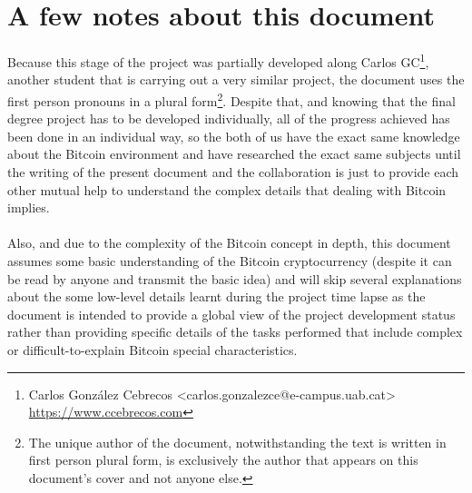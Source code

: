 \documentclass[a4paper,12pt,openany]{report}
\begin{document}
\tableofcontents
\clearpage

\chapter*{A few notes about this document}
Because this stage of the project was partially developed along Carlos GC\footnote{Carlos González Cebrecos <carlos.gonzalezce@e-campus.uab.cat> \url{https://www.ccebrecos.com}}, another student that is carrying out a very similar project, the document uses the first person pronouns in a plural form\footnote{The unique author of the document, notwithstanding the text is written in first person plural form, is exclusively the author that appears on this document's cover and not anyone else.}. Despite that, and knowing that the final degree project has to be developed individually, all of the progress achieved has been done in an individual way, so the both of us have the exact same knowledge about the Bitcoin environment and have researched the exact same subjects until the writing of the present document and the collaboration is just to provide each other mutual help to understand the complex details that dealing with Bitcoin implies.\\\\

Also, and due to the complexity of the Bitcoin concept in depth, this document assumes some basic understanding of the Bitcoin cryptocurrency (despite it can be read by anyone and transmit the basic idea) and will skip several explanations about the some low-level details learnt during the project time lapse as the document is intended to provide a global view of the project development status rather than providing specific details of the tasks performed that include complex or difficult-to-explain Bitcoin special characteristics.

\pagestyle{fancy}

\cleardoublepage
\setcounter{chapter}{1}
\setcounter{section}{0}

\setcounter{chapter}{2}
\setcounter{section}{0}

\setcounter{chapter}{3}
\setcounter{section}{0}

\setcounter{chapter}{4}
\setcounter{section}{0}

\appendix

\end{document}
